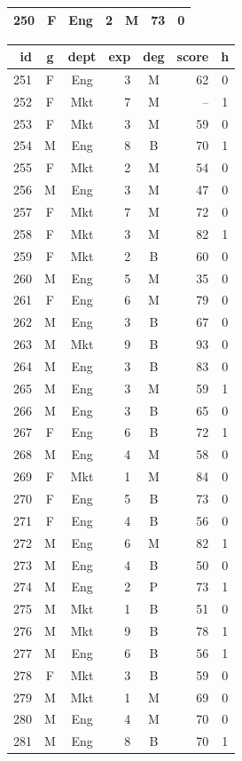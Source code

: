 \documentclass[11pt,a4paper]{article}
\begin{document}
\begin{center}
\begin{tabular}[t]{@{}r c c r c r c@{}}
250 & F & Eng & 2 & M & 73 & 0 \\
\bottomrule
\end{tabular}
\hfill
\begin{tabular}[t]{@{}r c c r c r c@{}}
\toprule
id & g & dept & exp & deg & score & h \\
\midrule
251 & F & Eng & 3 & M & 62 & 0 \\
252 & F & Mkt & 7 & M & -- & 1 \\
253 & F & Mkt & 3 & M & 59 & 0 \\
254 & M & Eng & 8 & B & 70 & 1 \\
255 & F & Mkt & 2 & M & 54 & 0 \\
256 & M & Eng & 3 & M & 47 & 0 \\
257 & F & Mkt & 7 & M & 72 & 0 \\
258 & F & Mkt & 3 & M & 82 & 1 \\
259 & F & Mkt & 2 & B & 60 & 0 \\
260 & M & Eng & 5 & M & 35 & 0 \\
261 & F & Eng & 6 & M & 79 & 0 \\
262 & M & Eng & 3 & B & 67 & 0 \\
263 & M & Mkt & 9 & B & 93 & 0 \\
264 & M & Eng & 3 & B & 83 & 0 \\
265 & M & Eng & 3 & M & 59 & 1 \\
266 & M & Eng & 3 & B & 65 & 0 \\
267 & F & Eng & 6 & B & 72 & 1 \\
268 & M & Eng & 4 & M & 58 & 0 \\
269 & F & Mkt & 1 & M & 84 & 0 \\
270 & F & Eng & 5 & B & 73 & 0 \\
271 & F & Eng & 4 & B & 56 & 0 \\
272 & M & Eng & 6 & M & 82 & 1 \\
273 & M & Eng & 4 & B & 50 & 0 \\
274 & M & Eng & 2 & P & 73 & 1 \\
275 & M & Mkt & 1 & B & 51 & 0 \\
276 & M & Mkt & 9 & B & 78 & 1 \\
277 & M & Eng & 6 & B & 56 & 1 \\
278 & F & Mkt & 3 & B & 59 & 0 \\
279 & M & Mkt & 1 & M & 69 & 0 \\
280 & M & Eng & 4 & M & 70 & 0 \\
281 & M & Eng & 8 & B & 70 & 1 \\

\end{tabular}
\end{center}
\end{document}
